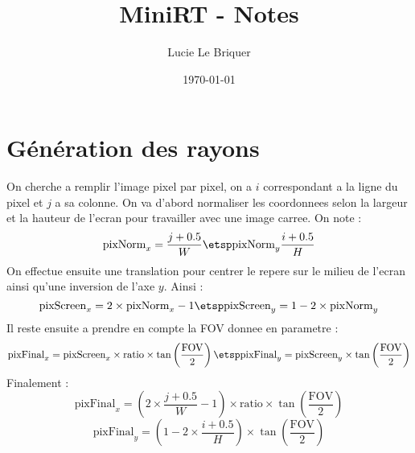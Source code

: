 

\title{\LARGE \textbf{MiniRT} - Notes}
\author{\large Lucie Le Briquer}
\date{\today}


\maketitle
\tableofcontents
\newpage\section{Génération des rayons}
\begin{center}
\hspace{1cm}
\end{center}
\dd\ni On cherche a remplir l'image pixel par pixel, on a $i$ correspondant a la
ligne du pixel et $j$ a sa colonne. On va d'abord normaliser les coordonnees
selon la largeur et la hauteur de l'ecran pour travailler avec une image carree.
On note :
$$\text{pixNorm}_x=\frac{j + 0.5} W \etsp\text{pixNorm}_y\frac{i + 0.5} H$$
\ni On effectue ensuite une translation pour centrer le repere sur le milieu de
l'ecran ainsi qu'une inversion de l'axe $y$. Ainsi :
$$\text{pixScreen}_x=2 \times\text{pixNorm}_x -1 \etsp \text{pixScreen}_y = 1 -
2\times \text{pixNorm}_y$$
\ni Il reste ensuite a prendre en compte la FOV donnee en parametre :
$$\text{pixFinal}_x = \text{pixScreen}_x \times \text{ratio}
\times\tan\left(\frac{\text{FOV}} 2\right)\etsp \text{pixFinal}_y = 
\text{pixScreen}_y \times\tan\left(\frac{\text{FOV}} 2\right)$$
\ni Finalement :
$$\text{pixFinal}_x = \left(2\times \frac{j+0.5}{W}- 1\right)
\times \text{ratio}\times\tan\left(\frac{\text{FOV}} 2\right)$$
$$\text{pixFinal}_y = \left(1 - 2\times \frac{i+0.5}{H}\right)
\times\tan\left(\frac{\text{FOV}} 2\right)$$


